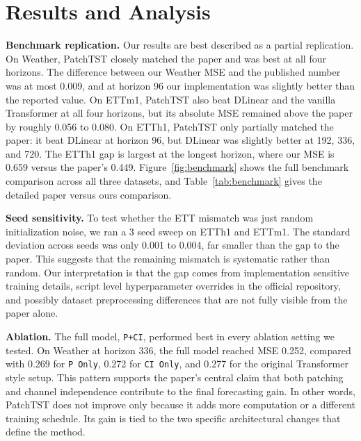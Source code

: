 \documentclass[11pt]{article}
\begin{document}
\section{Results and Analysis}

\textbf{Benchmark replication.} Our results are best described as a partial replication. On Weather, PatchTST closely matched the paper and was best at all four horizons. The difference between our Weather MSE and the published number was at most 0.009, and at horizon 96 our implementation was slightly better than the reported value. On ETTm1, PatchTST also beat DLinear and the vanilla Transformer at all four horizons, but its absolute MSE remained above the paper by roughly 0.056 to 0.080. On ETTh1, PatchTST only partially matched the paper: it beat DLinear at horizon 96, but DLinear was slightly better at 192, 336, and 720. The ETTh1 gap is largest at the longest horizon, where our MSE is 0.659 versus the paper's 0.449. Figure~\ref{fig:benchmark} shows the full benchmark comparison across all three datasets, and Table~\ref{tab:benchmark} gives the detailed paper versus ours comparison.

\textbf{Seed sensitivity.} To test whether the ETT mismatch was just random initialization noise, we ran a 3 seed sweep on ETTh1 and ETTm1. The standard deviation across seeds was only 0.001 to 0.004, far smaller than the gap to the paper. This suggests that the remaining mismatch is systematic rather than random. Our interpretation is that the gap comes from implementation sensitive training details, script level hyperparameter overrides in the official repository, and possibly dataset preprocessing differences that are not fully visible from the paper alone.

\textbf{Ablation.} The full model, \texttt{P+CI}, performed best in every ablation setting we tested. On Weather at horizon 336, the full model reached MSE 0.252, compared with 0.269 for \texttt{P Only}, 0.272 for \texttt{CI Only}, and 0.277 for the original Transformer style setup. This pattern supports the paper's central claim that both patching and channel independence contribute to the final forecasting gain. In other words, PatchTST does not improve only because it adds more computation or a different training schedule. Its gain is tied to the two specific architectural changes that define the method.
\end{document}
